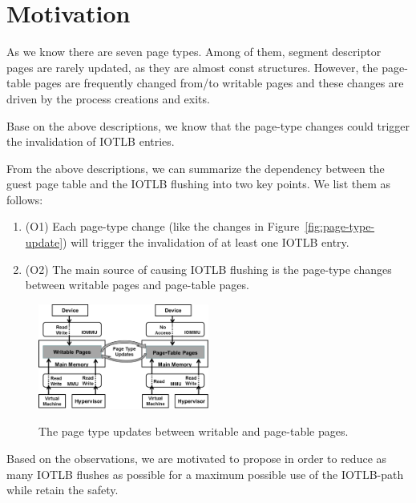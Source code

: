 \section{Motivation} \label{sec:moti}
As we know there are seven page types.
Among of them, segment descriptor pages are rarely updated, as they are almost const structures.  
However, the page-table pages are frequently changed from/to writable pages 
and these changes are driven by the process creations and exits.

Base on the above descriptions, we know that the page-type changes could trigger the invalidation of IOTLB entries.


From the above descriptions, we can summarize the dependency between the guest page table and the IOTLB flushing into two key points. We list them as follows:
\begin{enumerate}
\item (O1) Each page-type change (like the changes in Figure~\ref{fig:page-type-update}) will trigger the invalidation of at least one IOTLB entry.
\item (O2) The main source of causing IOTLB flushing is the page-type changes between writable pages and page-table pages.
\end{enumerate}

\begin{figure}[ht]
\centering
\includegraphics[width=0.5\textwidth]{image/background/wr2pt.png} \\
\caption{The page type updates between writable and page-table pages.}
\label{fig:wr2pt}
\end{figure}




Based on the observations, we are motivated to propose \name in order to reduce as many IOTLB flushes as possible for a maximum possible use of the IOTLB-path while retain the safety.
